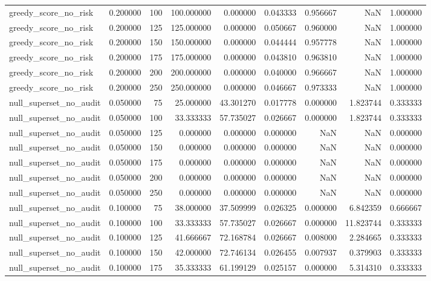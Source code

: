 \begin{tabular}{lrrrrrrrr}
greedy_score_no_risk & 0.200000 & 100 & 100.000000 & 0.000000 & 0.043333 & 0.956667 & NaN & 1.000000 \\
greedy_score_no_risk & 0.200000 & 125 & 125.000000 & 0.000000 & 0.050667 & 0.960000 & NaN & 1.000000 \\
greedy_score_no_risk & 0.200000 & 150 & 150.000000 & 0.000000 & 0.044444 & 0.957778 & NaN & 1.000000 \\
greedy_score_no_risk & 0.200000 & 175 & 175.000000 & 0.000000 & 0.043810 & 0.963810 & NaN & 1.000000 \\
greedy_score_no_risk & 0.200000 & 200 & 200.000000 & 0.000000 & 0.040000 & 0.966667 & NaN & 1.000000 \\
greedy_score_no_risk & 0.200000 & 250 & 250.000000 & 0.000000 & 0.046667 & 0.973333 & NaN & 1.000000 \\
null_superset_no_audit & 0.050000 & 75 & 25.000000 & 43.301270 & 0.017778 & 0.000000 & 1.823744 & 0.333333 \\
null_superset_no_audit & 0.050000 & 100 & 33.333333 & 57.735027 & 0.026667 & 0.000000 & 1.823744 & 0.333333 \\
null_superset_no_audit & 0.050000 & 125 & 0.000000 & 0.000000 & 0.000000 & NaN & NaN & 0.000000 \\
null_superset_no_audit & 0.050000 & 150 & 0.000000 & 0.000000 & 0.000000 & NaN & NaN & 0.000000 \\
null_superset_no_audit & 0.050000 & 175 & 0.000000 & 0.000000 & 0.000000 & NaN & NaN & 0.000000 \\
null_superset_no_audit & 0.050000 & 200 & 0.000000 & 0.000000 & 0.000000 & NaN & NaN & 0.000000 \\
null_superset_no_audit & 0.050000 & 250 & 0.000000 & 0.000000 & 0.000000 & NaN & NaN & 0.000000 \\
null_superset_no_audit & 0.100000 & 75 & 38.000000 & 37.509999 & 0.026325 & 0.000000 & 6.842359 & 0.666667 \\
null_superset_no_audit & 0.100000 & 100 & 33.333333 & 57.735027 & 0.026667 & 0.000000 & 11.823744 & 0.333333 \\
null_superset_no_audit & 0.100000 & 125 & 41.666667 & 72.168784 & 0.026667 & 0.008000 & 2.284665 & 0.333333 \\
null_superset_no_audit & 0.100000 & 150 & 42.000000 & 72.746134 & 0.026455 & 0.007937 & 0.379903 & 0.333333 \\
null_superset_no_audit & 0.100000 & 175 & 35.333333 & 61.199129 & 0.025157 & 0.000000 & 5.314310 & 0.333333 \\

\end{tabular}
